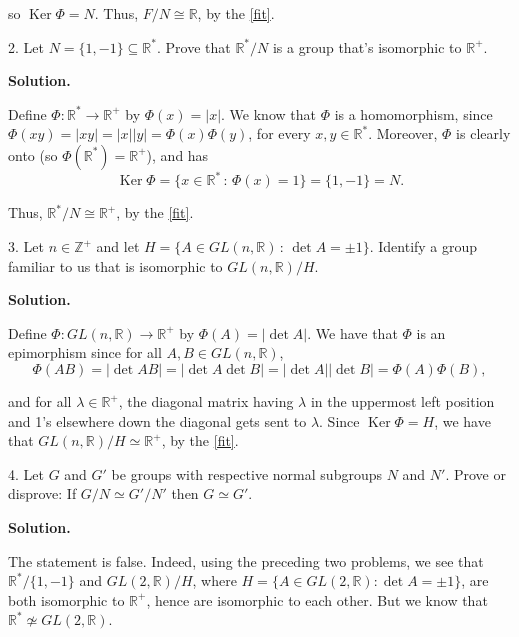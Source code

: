 \documentclass[10pt,]{book}
\theoremstyle{plain}
\theoremstyle{definition}
\theoremstyle{definition}
\theoremstyle{definition}
\theoremstyle{definition}
\numberwithin{equation}{section}
\def\Z{\mathbb{Z}}
\def\R{\mathbb{R}}
\DeclareMathOperator{\Ker}{Ker}
\begin{document}
\begin{exerciselist}
      so \(\Ker
      \Phi=N\). Thus, \(F/N \cong \R\), by the \hyperref[fit]{\ref{fit}}.
\item[2.]\hypertarget{exercise-64}{}
        Let \(N=\{1,-1\}\subseteq \R^*\). Prove that \(\R^*/N\) is
        a group that's isomorphic to
        \(\R^+\).
\par\smallskip
\par\smallskip
\noindent\textbf{Solution.}\hypertarget{solution-64}{}\quad

      Define \(\Phi: \R^* \rightarrow \R^+\) by
      \(\Phi(x)=|x|\). We know that \(\Phi\) is a homomorphism, since
      \(\Phi(xy)=|xy|=|x||y|=\Phi(x)\Phi(y)\), for every \(x,y\in \R^*\).
      Moreover, \(\Phi\) is clearly onto (so \(\Phi(\R^*)=\R^+\)), and
      has
\begin{equation*}

        \Ker \Phi=\{x\in \R^*\,:\,\Phi(x)=1\}=\{1,-1\}=N.
      
\end{equation*}

\par

      Thus,
      \(\R^*/N \cong \R^+\), by the \hyperref[fit]{\ref{fit}}.
\item[3.]\hypertarget{exercise-65}{}
        Let \(n\in \Z^+\) and let \(H=\{A\in GL(n,\R)\,:\, \det A =\pm
        1\}\). Identify a group familiar to us that is isomorphic to
        \(GL(n,\R)/H\).
\par\smallskip
\par\smallskip
\noindent\textbf{Solution.}\hypertarget{solution-65}{}\quad

      Define \(\Phi:GL(n,\R)\to \R^+\) by
      \(\Phi(A)=|\det A|\). We have that \(\Phi\) is an epimorphism since for
      all \(A,B\in GL(n,\R)\),
\begin{equation*}

        \Phi(AB)=|\det AB|=|\det A \det B|=|\det
        A||\det B|=\Phi(A)\Phi(B),
      
\end{equation*}

      and for all \(\lambda \in \R^+\), the
      diagonal matrix having \(\lambda\) in the uppermost left position and
      1's elsewhere down the diagonal gets sent to \(\lambda\). Since \(\Ker
      \Phi=H\), we have that \(GL(n,\R)/H \simeq \R^+\), by the \hyperref[fit]{\ref{fit}}.
\item[4.]\hypertarget{exercise-66}{}
        Let \(G\) and \(G'\) be groups with respective normal subgroups
        \(N\) and \(N'\). Prove or disprove: If \(G/N\simeq G'/N'\) then \(G\simeq
        G'\).
\par\smallskip
\par\smallskip
\noindent\textbf{Solution.}\hypertarget{solution-66}{}\quad

      The statement is false. Indeed, using the preceding two problems, we see that \(\R^*/\{1,-1\}\) and \(GL(2,\R)/H\),
      where \(H=\{A\in GL(2,\R):\det A =\pm 1\}\), are both isomorphic
      to \(\R^+\), hence are isomorphic to each other. But we know that
      \(\R^* \not\simeq GL(2,\R)\).
\end{exerciselist}
\end{document}
